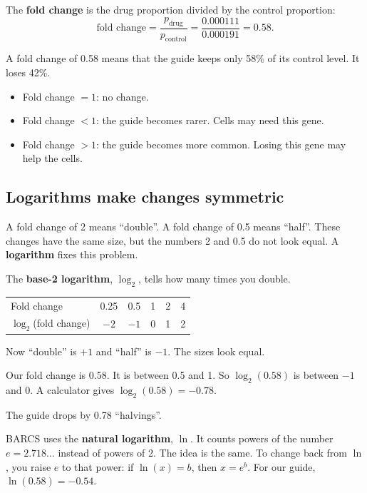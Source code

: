The \textbf{fold change} is the drug proportion divided by the control
proportion:
\[
\text{fold change} = \frac{p_{\text{drug}}}{p_{\text{control}}}
 = \frac{0.000111}{0.000191} = 0.58.
\]

A fold change of 0.58 means that the guide keeps only 58\% of its control
level. It loses 42\%.

\begin{remember}
\begin{itemize}[leftmargin=1.2em]
\item Fold change $= 1$: no change.
\item Fold change $< 1$: the guide becomes rarer. Cells may need this gene.
\item Fold change $> 1$: the guide becomes more common. Losing this gene
  may help the cells.
\end{itemize}
\end{remember}

\subsection{Logarithms make changes symmetric}

A fold change of 2 means ``double''. A fold change of 0.5 means ``half''.
These changes have the same size, but the numbers 2 and 0.5 do not look
equal. A \textbf{logarithm} fixes this problem.

The \textbf{base-2 logarithm}, $\log_2$, tells how many times you double.
\begin{center}
\begin{tabular}{lccccc}
\toprule
Fold change & 0.25 & 0.5 & 1 & 2 & 4\\
$\log_2$(fold change) & $-2$ & $-1$ & 0 & 1 & 2\\
\bottomrule
\end{tabular}
\end{center}
Now ``double'' is $+1$ and ``half'' is $-1$. The sizes look equal.

\begin{worked}
Our fold change is 0.58. It is between 0.5 and 1. So $\log_2(0.58)$ is
between $-1$ and 0. A calculator gives $\log_2(0.58) = -0.78$.

The guide drops by 0.78 ``halvings''.
\end{worked}

BARCS uses the \textbf{natural logarithm}, $\ln$. It counts powers of the
number $e = 2.718\ldots$ instead of powers of 2. The idea is the same. To
change back from $\ln$, you raise $e$ to that power: if $\ln(x) = b$, then
$x = e^{b}$. For our guide, $\ln(0.58) = -0.54$.

